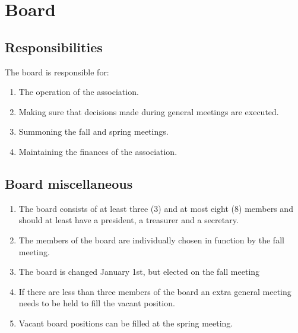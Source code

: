 \section*{Board}
\subsection{Responsibilities}
The board is responsible for:
\begin{enumerate}
  \item The operation of the association.
  \item Making sure that decisions made during general meetings are executed.
  \item Summoning the fall and spring meetings. 
  \item Maintaining the finances of the association. 
\end{enumerate}

\subsection{Board miscellaneous}
\begin{enumerate}
  \item The board consists of at least three (3) and at most eight (8) members and should at least have a president, a treasurer and a secretary.
  \item The members of the board are individually chosen in function by the fall meeting.
  \item The board is changed January 1st, but elected on the fall meeting
  \item If there are less than three members of the board an extra general meeting needs to be held to fill the vacant position.
  \item Vacant board positions can be filled at the spring meeting.
  
\end{enumerate}

